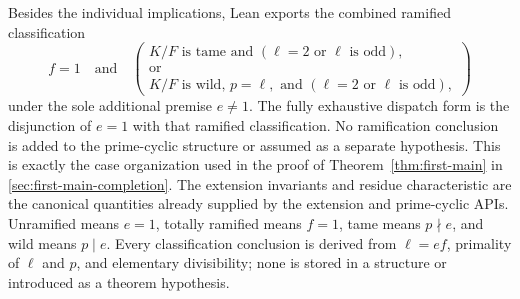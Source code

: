 \begin{theorem}
Besides the individual implications, Lean exports the combined ramified
classification
\[
 f=1\quad\text{and}\quad
 \left(
   \begin{array}{l}
   K/F\text{ is tame and }(\ell=2\text{ or }\ell\text{ is odd}),\\
   \text{or}\\
   K/F\text{ is wild, }p=\ell,\text{ and }
     (\ell=2\text{ or }\ell\text{ is odd}),
   \end{array}
 \right)
\]
under the sole additional premise $e\ne1$.  The fully exhaustive dispatch
form is the disjunction of $e=1$ with that ramified classification.  No
ramification conclusion is added to the prime-cyclic structure or assumed
as a separate hypothesis.  This is exactly the case organization used in
the proof of Theorem~\ref{thm:first-main} in
\ref{sec:first-main-completion}.
\leanok
{}
\FormalizationContract The extension invariants and residue
characteristic are the canonical quantities already supplied by the
extension and prime-cyclic APIs.  Unramified means $e=1$, totally ramified
means $f=1$, tame means $p\nmid e$, and wild means $p\mid e$.  Every
classification conclusion is derived from $\ell=ef$, primality of
$\ell$ and $p$, and elementary divisibility; none is stored in a structure
or introduced as a theorem hypothesis.
\end{theorem}
